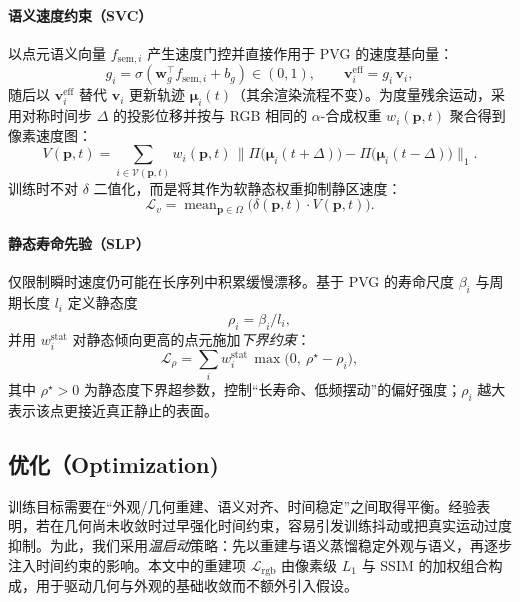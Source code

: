 \documentclass[10pt,conference]{IEEEtran} %
\begin{document}
\paragraph{语义速度约束（SVC）}
以点元语义向量 $f_{\mathrm{sem},i}$ 产生速度门控并直接作用于 PVG 的速度基向量：
\begin{equation}
g_i=\sigma(\mathbf w_g^\top f_{\mathrm{sem},i}+b_g)\in(0,1),\qquad
\bm{v}_i^{\mathrm{eff}}=g_i\,\bm{v}_i,
\label{eq:svc_gate}
\end{equation}
随后以 $\bm{v}_i^{\mathrm{eff}}$ 替代 $\bm{v}_i$ 更新轨迹 $\bm{\mu}_i(t)$（其余渲染流程不变）。为度量残余运动，采用对称时间步 $\Delta$ 的投影位移并按与 RGB 相同的 $\alpha$-合成权重 $w_i(\mathbf p,t)$ 聚合得到像素速度图：
\begin{equation}
V(\mathbf p,t)=\sum_{i\in\mathcal V(\mathbf p,t)} w_i(\mathbf p,t)\,
\big\|\Pi\!\big(\bm{\mu}_i(t+\Delta)\big)-\Pi\!\big(\bm{\mu}_i(t-\Delta)\big)\big\|_1 .
\label{eq:vel_map}
\end{equation}
训练时不对 $\delta$ 二值化，而是将其作为软静态权重抑制静区速度：
\begin{equation}
\mathcal L_{v}=\operatorname{mean}_{\mathbf p\in\Omega}\!\big(\delta(\mathbf p,t)\cdot V(\mathbf p,t)\big).
\label{eq:svc_loss}
\end{equation}

\paragraph{静态寿命先验（SLP）}
仅限制瞬时速度仍可能在长序列中积累缓慢漂移。基于 PVG 的寿命尺度 $\beta_i$ 与周期长度 $l_i$ 定义静态度
\begin{equation}
\rho_i=\beta_i/l_i,
\end{equation}
并用 $w_i^{\mathrm{stat}}$ 对静态倾向更高的点元施加\emph{下界约束}：
\begin{equation}
\mathcal L_{\rho}=\sum_{i} w_i^{\mathrm{stat}}\,
\max\!\big(0,\ \rho^\star-\rho_i\big),
\label{eq:slp_loss}
\end{equation}
其中 $\rho^\star>0$ 为静态度下界超参数，控制“长寿命、低频摆动”的偏好强度；$\rho_i$ 越大表示该点更接近真正静止的表面。

\subsection{优化（Optimization)}
训练目标需要在“外观/几何重建、语义对齐、时间稳定”之间取得平衡。经验表明，若在几何尚未收敛时过早强化时间约束，容易引发训练抖动或把真实运动过度抑制。为此，我们采用\emph{温启动}策略：先以重建与语义蒸馏稳定外观与语义，再逐步注入时间约束的影响。本文中的重建项 $\mathcal L_{\mathrm{rgb}}$ 由像素级 $L_1$ 与 SSIM 的加权组合构成，用于驱动几何与外观的基础收敛而不额外引入假设。
\end{document}
